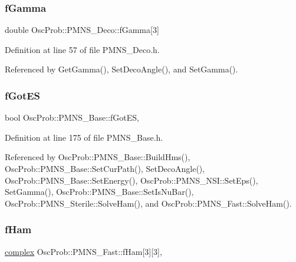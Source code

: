 \subsubsection{\texorpdfstring{f\+Gamma}{fGamma}}
{\footnotesize\ttfamily double Osc\+Prob\+::\+P\+M\+N\+S\+\_\+\+Deco\+::f\+Gamma\mbox{[}3\mbox{]}\hspace{0.3cm}{\ttfamily [protected]}}



Definition at line 57 of file P\+M\+N\+S\+\_\+\+Deco.\+h.



Referenced by Get\+Gamma(), Set\+Deco\+Angle(), and Set\+Gamma().

\mbox{\label{classOscProb_1_1PMNS__Base_a6dc5cd010d2d70b2324745b4e53e9839}} 
\subsubsection{\texorpdfstring{f\+Got\+ES}{fGotES}}
{\footnotesize\ttfamily bool Osc\+Prob\+::\+P\+M\+N\+S\+\_\+\+Base\+::f\+Got\+ES\hspace{0.3cm}{\ttfamily [protected]}, {\ttfamily [inherited]}}



Definition at line 175 of file P\+M\+N\+S\+\_\+\+Base.\+h.



Referenced by Osc\+Prob\+::\+P\+M\+N\+S\+\_\+\+Base\+::\+Build\+Hms(), Osc\+Prob\+::\+P\+M\+N\+S\+\_\+\+Base\+::\+Set\+Cur\+Path(), Set\+Deco\+Angle(), Osc\+Prob\+::\+P\+M\+N\+S\+\_\+\+Base\+::\+Set\+Energy(), Osc\+Prob\+::\+P\+M\+N\+S\+\_\+\+N\+S\+I\+::\+Set\+Eps(), Set\+Gamma(), Osc\+Prob\+::\+P\+M\+N\+S\+\_\+\+Base\+::\+Set\+Is\+Nu\+Bar(), Osc\+Prob\+::\+P\+M\+N\+S\+\_\+\+Sterile\+::\+Solve\+Ham(), and Osc\+Prob\+::\+P\+M\+N\+S\+\_\+\+Fast\+::\+Solve\+Ham().

\mbox{\label{classOscProb_1_1PMNS__Fast_aab37f2a7f59ab7026a8a21a561115dd0}} 
\subsubsection{\texorpdfstring{f\+Ham}{fHam}}
{\footnotesize\ttfamily \hyperlink{classOscProb_1_1PMNS__Base_ae86ec4718808ce9d02e5f5b4226714ab}{complex} Osc\+Prob\+::\+P\+M\+N\+S\+\_\+\+Fast\+::f\+Ham\mbox{[}3\mbox{]}\mbox{[}3\mbox{]}\hspace{0.3cm}{\ttfamily [protected]}, {\ttfamily [inherited]}}



